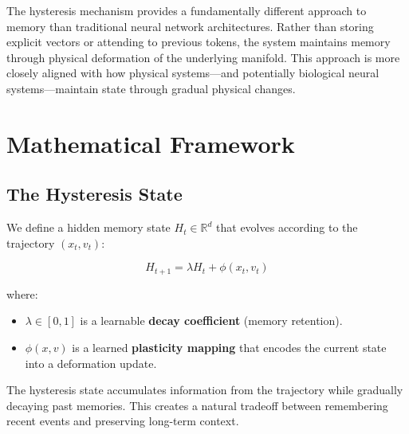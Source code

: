 \documentclass[12pt,a4paper]{article}
\begin{document}
The hysteresis mechanism provides a fundamentally different approach to memory than traditional neural network architectures. Rather than storing explicit vectors or attending to previous tokens, the system maintains memory through physical deformation of the underlying manifold. This approach is more closely aligned with how physical systems—and potentially biological neural systems—maintain state through gradual physical changes.

\section{Mathematical Framework}

\subsection{The Hysteresis State}

We define a hidden memory state $H_t \in \mathbb{R}^d$ that evolves according to the trajectory $(x_t, v_t)$:

\begin{equation}
H_{t+1} = \lambda H_t + \phi(x_t, v_t)
\end{equation}

where:
\begin{itemize}[leftmargin=1.5cm]
\item $\lambda \in [0, 1]$ is a learnable \textbf{decay coefficient} (memory retention).
\item $\phi(x, v)$ is a learned \textbf{plasticity mapping} that encodes the current state into a deformation update.
\end{itemize}

The hysteresis state accumulates information from the trajectory while gradually decaying past memories. This creates a natural tradeoff between remembering recent events and preserving long-term context.
\end{document}

